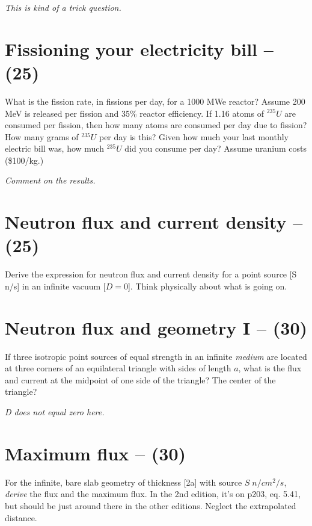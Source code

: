 \documentclass[11pt,a4paper]{article}
\begin{document}
\textit{This is kind of a trick question.}





\newpage

\section{Fissioning your electricity bill -- (25)}
What is the fission rate, in fissions per day, for a 1000 MWe reactor? Assume 200 MeV is released per fission and 35\% reactor efficiency. If 1.16 atoms of $^{235}U$ are consumed per fission, then how many atoms are consumed per day due to fission? How many grams of $^{235}U$ per day is this? Given how much your last monthly electric bill was, how much $^{235}U$ did you consume per day?  Assume uranium costs (\$100/kg.) 


\textit{Comment on the results.}





\newpage

\section{Neutron flux and current density -- (25)}
Derive the expression for neutron flux and current density for a point source [S n/s] in an infinite vacuum [$D = 0$]. Think physically about what is going on. 





\newpage

\section{Neutron flux and geometry I -- (30)}
If three isotropic point sources of equal strength in an infinite \textit{medium} are located at three corners of an equilateral triangle with sides of length $a$, what is the flux and current at the midpoint of one side of the triangle? The center of the triangle? 


\noindent\textit{D does not equal zero here.}





\newpage

\section{Maximum flux -- (30)}
For the infinite, bare slab geometry of thickness [2a] with source $S \; n/cm^2/s$, \textit{derive} the flux and the maximum flux. In the 2nd edition, it's on p203, eq. 5.41, but should be just around there in the other editions. Neglect the extrapolated distance.
\end{document}

